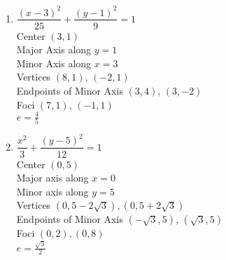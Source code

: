 \documentclass{ximera}
\begin{document}
\begin{multicols}{2}
\begin{enumerate}
\setcounter{enumi}{\value{HW}}

\item  $\dfrac{(x-3)^2}{25} + \dfrac{\left(y-1\right)^2}{9} = 1$\\
Center  $\left(3, 1 \right)$\\
Major Axis along $y=1$\\
Minor Axis along $x=3$\\
Vertices  $\left( 8, 1   \right)$, $(-2, 1)$\\
Endpoints of Minor Axis $\left(3,4\right)$, $\left(3,-2\right)$\\
Foci $\left(7,1 \right)$, $\left(-1, 1\right)$\\
$e = \frac{4}{5}$


\vfill

\columnbreak


\item $\dfrac{x^{2}}{3} + \dfrac{(y - 5)^{2}}{12} = 1$\\
Center $(0, 5)$\\
Major axis along $x = 0$\\
Minor axis along $y = 5$\\
Vertices $(0, 5 - 2\sqrt{3}), (0, 5 + 2\sqrt{3})$\\
Endpoints of Minor Axis $(-\sqrt{3},5)$, $(\sqrt{3},5)$\\
Foci $(0, 2), (0, 8)$\\
$e = \frac{\sqrt{3}}{2}$


\setcounter{HW}{\value{enumi}}
\end{enumerate}
\end{multicols}
\end{document}
